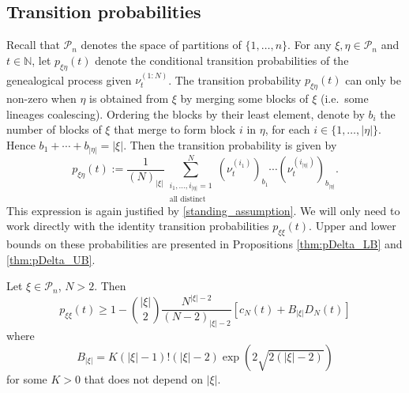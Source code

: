 \subsection{Transition probabilities}
Recall that $\mathcal{P}_n$ denotes the space of partitions of $\{1,\dots,n\}$.
For any $\xi, \eta \in \mathcal{P}_n$ and $t\in\mathbb{N}$, let $p_{\xi\eta}(t)$ denote the conditional transition probabilities of the genealogical process given $\nu_t^{(1:N)}$. %
The transition probability $p_{\xi\eta}(t)$ can only be non-zero when $\eta$ is obtained from $\xi$ by merging some blocks of $\xi$ (i.e.\ some lineages coalescing).
Ordering the blocks by their least element, denote by $b_i$ the number of blocks of $\xi$ that merge to form block $i$ in $\eta$, for each $i \in \{1,\dots, |\eta|\}$. Hence $b_1 + \cdots + b_{|\eta|} = |\xi|$.
Then the transition probability is given by
\begin{equation}\label{eq:defn_pxieta}
p_{\xi\eta}(t) 
:= \frac{1}{(N)_{|\xi|}} \sum_{\substack{i_1 , \ldots , i_{|\eta|} =1 
        \\ \text{all distinct} }}^N
        (\nu_t^{(i_1)})_{b_1} \cdots (\nu_t^{(i_{|\eta|})})_{b_{|\eta|}} .
\end{equation}
This expression is again justified by \ref{standing_assumption}.
We will only need to work directly with the identity transition probabilities $p_{\xi\xi}(t)$.
Upper and lower bounds on these probabilities are presented in Propositions \ref{thm:pDelta_LB} and \ref{thm:pDelta_UB}.
\begin{prop}%
\label{thm:pDelta_LB}
Let $\xi \in \mathcal{P}_n$, $N>2$. Then
\begin{equation*}
p_{\xi\xi}(t)
\geq 1 - \binom{|\xi|}{2} \frac{N^{|\xi|-2}}{(N-2)_{|\xi|-2}} \left[ c_N(t) + B_{|\xi|} D_N(t) \right]
\end{equation*}
where 
\begin{equation*}
B_{|\xi|} = K (|\xi|-1)! (|\xi|-2) \exp( 2 \sqrt{2(|\xi|-2)} )
\end{equation*}
for some $K>0$ that does not depend on $|\xi|$.
\end{prop}
